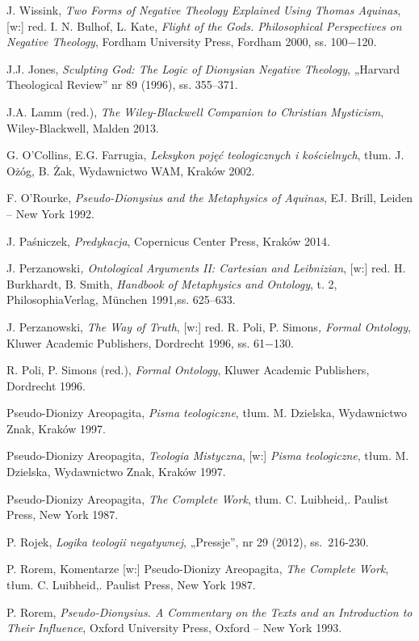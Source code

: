 \begin{thebibliography}{99}
\bibitem{} J. Wissink, \textit{Two Forms of Negative Theology Explained Using
Thomas Aquinas}, [w:] red. I. N. Bulhof, L. Kate, \textit{Flight of the
Gods. Philosophical Perspectives on Negative Theology}, Fordham
University Press, Fordham 2000, ss. 100$-$120.

\bibitem{} J.J. Jones, \textit{Sculpting God: The Logic of Dionysian Negative
Theology}, „Harvard Theological Review” nr 89 (1996), ss. 355–371.

\bibitem{} J.A. Lamm (red.), \textit{The Wiley-Blackwell Companion to Christian
Mysticism}, Wiley-Blackwell, Malden 2013.

\bibitem{} G. O'Collins, E.G. Farrugia, \textit{Leksykon pojęć
teologicznych i kościelnych}, tłum. J. Ożóg, B. Żak, Wydawnictwo WAM,
Kraków 2002.

\bibitem{} F. O'Rourke, \textit{Pseudo-Dionysius and the
Metaphysics of Aquinas}, EJ. Brill, Leiden – New York 1992.

\bibitem{} J. Paśniczek, \textit{Predykacja}, Copernicus Center Press, Kraków 2014.

\bibitem{} J. Perzanowski\textit{, Ontological Arguments II: Cartesian and
Leibnizian}, [w:] red. H. Burkhardt, B. Smith, \textit{Handbook of
Metaphysics and Ontology}, t. 2, PhilosophiaVerlag, München 1991,ss.
625–633.

\bibitem{} J. Perzanowski, \textit{The Way of Truth}, [w:] red. R. Poli, P.
Simons\textit{, Formal Ontology}, Kluwer Academic Publishers, Dordrecht
1996, ss. 61$-$130.

\bibitem{} R. Poli, P. Simons (red.), \textit{Formal Ontology}, Kluwer Academic
Publishers, Dordrecht 1996.

\bibitem{} Pseudo-Dionizy Areopagita, \textit{Pisma teologiczne}, tłum. M.
Dzielska, Wydawnictwo Znak, Kraków 1997.

\bibitem{} Pseudo-Dionizy Areopagita, \textit{Teologia Mistyczna}, [w:]
\textit{Pisma teologiczne}, tłum. M. Dzielska, Wydawnictwo Znak, Kraków
1997.

\bibitem{} Pseudo-Dionizy Areopagita, \textit{The Complete Work}, tłum. C.
Luibheid,. Paulist Press, New York 1987.

\bibitem{} P. Rojek, \textit{Logika teologii negatywnej}, „Pressje”, nr 29 (2012),
ss.~216-230.

\bibitem{} P. Rorem, Komentarze [w:] Pseudo-Dionizy Areopagita, \textit{The
Complete Work}, tłum. C. Luibheid,. Paulist Press, New York 1987.

\bibitem{} P. Rorem, \textit{Pseudo-Dionysius. A Commentary on the Texts and an
Introduction to Their Influence}, Oxford University Press, Oxford – New
York 1993.


\end{thebibliography}
